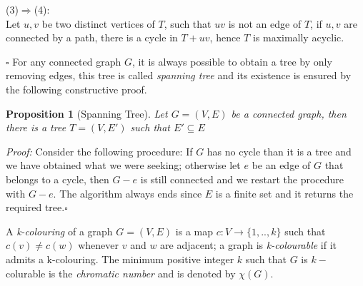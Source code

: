\documentclass[a4paper,12pt,twoside]{book}
\newtheorem{proposition}[theorem]{Proposition}
\newcommand*{\QED}{\hfill\ensuremath{\square}}
\begin{document}
(3)$\Rightarrow$(4):\\
Let $u,v$ be two distinct vertices of $T$, such that $uv$ is not an edge of $T$, if $u,v$ are connected by a path, there is a cycle in $T+uv$, hence $T$ is maximally acyclic.

\QED
\newpage For any connected graph $G$, it is always possible to obtain a tree by only removing edges, this tree is called \textit{spanning tree} and its existence is ensured by the following constructive proof.
\begin{proposition}[Spanning Tree]
Let $G=(V,E)$ be a connected graph, then there is a tree $T=(V,E')$ such that $E'\subseteq E$
\end{proposition}
\noindent\textit{Proof:}
Consider the following procedure: If $G$ has no cycle than it is a tree and we have obtained what we were seeking; otherwise let $e$ be an edge of $G$ that belongs to a cycle, then $G-e$ is still connected and we restart the procedure with $G-e$.
The algorithm always ends since $E$ is a finite set and it returns the required tree.\QED


A \textit{k-colouring} of a graph $G=(V,E)$ is a map $c:V \rightarrow \{1,..,k\} $ such that $c(v) \neq c(w) $ whenever $v$ and $w$ are adjacent; a graph is \textit{k-colourable} if it admits a k-colouring. The minimum positive integer $k$ such that $G$ is $k-$colurable is the \textit{chromatic number} and is denoted by $\chi (G)$.
\end{document}
